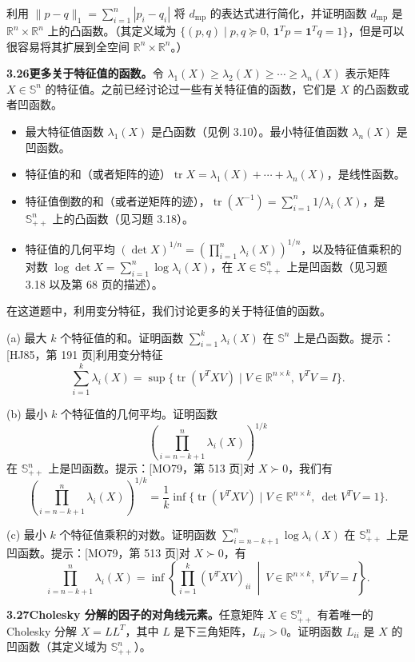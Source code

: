 \documentclass[UTF8, 12pt, fontset=fandol, oneside]{ctexart}
\begin{document}
利用 $\|p-q\|_1=\sum_{i=1}^n |p_i-q_i|$ 将 $d_{\mathrm{mp}}$ 的表达式进行简化，并证明函数 $d_{\mathrm{mp}}$ 是 $\mathbb{R}^n\times\mathbb{R}^n$ 上的凸函数。（其定义域为 $\{(p,q)\mid p,q\succeq0,\ \mathbf{1}^Tp=\mathbf{1}^Tq=1\}$，但是可以很容易将其扩展到全空间 $\mathbb{R}^n\times\mathbb{R}^n$。）

\noindent\textbf{3.26\quad 更多关于特征值的函数。}\quad 令 $\lambda_1(X)\geq\lambda_2(X)\geq\cdots\geq\lambda_n(X)$ 表示矩阵 $X\in\mathbb{S}^n$ 的特征值。之前已经讨论过一些有关特征值的函数，它们是 $X$ 的凸函数或者凹函数。
\begin{itemize}
\item 最大特征值函数 $\lambda_1(X)$ 是凸函数（见例 3.10）。最小特征值函数 $\lambda_n(X)$ 是凹函数。
\item 特征值的和（或者矩阵的迹）$\operatorname{tr}X=\lambda_1(X)+\cdots+\lambda_n(X)$，是线性函数。
\item 特征值倒数的和（或者逆矩阵的迹），$\operatorname{tr}(X^{-1})=\sum_{i=1}^n 1/\lambda_i(X)$，是 $\mathbb{S}_{++}^n$ 上的凸函数（见习题 3.18）。
\item 特征值的几何平均 $(\det X)^{1/n}=\left(\prod_{i=1}^n\lambda_i(X)\right)^{1/n}$，以及特征值乘积的对数 $\log\det X=\sum_{i=1}^n\log\lambda_i(X)$，在 $X\in\mathbb{S}_{++}^n$ 上是凹函数（见习题 3.18 以及第 68 页的描述）。
\end{itemize}

在这道题中，利用变分特征，我们讨论更多的关于特征值的函数。

(a) 最大 $k$ 个特征值的和。证明函数 $\sum_{i=1}^k\lambda_i(X)$ 在 $\mathbb{S}^n$ 上是凸函数。提示：[HJ85，第 191 页]利用变分特征
\[
\sum_{i=1}^k\lambda_i(X)=\sup\{\operatorname{tr}(V^TXV)\mid V\in\mathbb{R}^{n\times k},\ V^TV=I\}.
\]

(b) 最小 $k$ 个特征值的几何平均。证明函数
\[
\left(\prod_{i=n-k+1}^n\lambda_i(X)\right)^{1/k}
\]
在 $\mathbb{S}_{++}^n$ 上是凹函数。提示：[MO79，第 513 页]对 $X\succ0$，我们有
\[
\left(\prod_{i=n-k+1}^n\lambda_i(X)\right)^{1/k}
=\frac{1}{k}\inf\{\operatorname{tr}(V^TXV)\mid V\in\mathbb{R}^{n\times k},\ \det V^TV=1\}.
\]

(c) 最小 $k$ 个特征值乘积的对数。证明函数 $\sum_{i=n-k+1}^n\log\lambda_i(X)$ 在 $\mathbb{S}_{++}^n$ 上是凹函数。提示：[MO79，第 513 页]对 $X\succ0$，有
\[
\prod_{i=n-k+1}^n\lambda_i(X)
=\inf\left\{\prod_{i=1}^k (V^TXV)_{ii}\ \middle|\ V\in\mathbb{R}^{n\times k},\ V^TV=I\right\}.
\]

\noindent\textbf{3.27\quad Cholesky 分解的因子的对角线元素。}\quad 任意矩阵 $X\in\mathbb{S}_{++}^n$ 有着唯一的 Cholesky 分解 $X=LL^T$，其中 $L$ 是下三角矩阵，$L_{ii}>0$。证明函数 $L_{ii}$ 是 $X$ 的凹函数（其定义域为 $\mathbb{S}_{++}^n$）。
\end{document}
